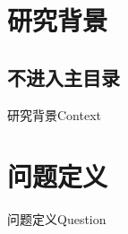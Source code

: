 \documentclass[aspectratio=169,fontset=none]{ctexbeamer}
\begin{document}
\OutlineSlide
\section{研究背景}
\subsection{不进入主目录}
\begin{frame}{研究背景}Context\end{frame}
\section{问题定义}
\begin{frame}{问题定义}Question\end{frame}
\end{document}
